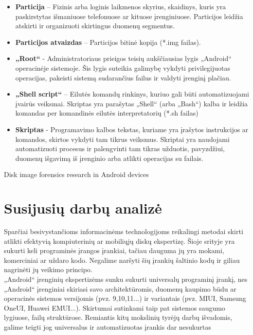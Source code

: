 \documentclass[a4paper,12pt,fleqn]{article}
\begin{document}
\begin{itemize}
     \item \textbf{Particija} – Fizinis arba loginis laikmenos skyrius, skaidinys, kuris yra paskirstytas išmaniuose telefonuose ar kituose įrenginiuose. Particijos leidžia atskirti ir organizuoti skirtingus duomenų segmentus.
     \item \textbf{Particijos atvaizdas} – Particijos bitinė kopija (*.img failas).
     \item \textbf{„Root“}  - Administratoriaus prieigos teisių aukščiausias lygis „Android“ operacinėje sistemoje. Šis lygis suteikia galimybę vykdyti privilegijuotas operacijas, pakeisti sistemą sudarančius failus ir valdyti įrenginį plačiau.
     \item \textbf{„Shell script“} – Eilutės komandų rinkinys, kuriuo gali būti automatizuojami įvairūs veiksmai. Skriptas yra parašytas „Shell“ (arba „Bash“) kalba ir leidžia komandas per komandinės eilutės interpretatorių (*.sh failas)
     \item \textbf{Skriptas} - Programavimo kalbos tekstas, kuriame yra įrašytos instrukcijos ar komandos, skirtos vykdyti tam tikrus veiksmus. Skriptai yra naudojami automatizuoti procesus ir palengvinti tam tikras užduotis, pavyzdžiui, duomenų išgavimą iš įrenginio arba atlikti operacijas su failais.
     

 \end{itemize}

\bothabstracts{}%
{Disk image forensics research in Android devices} %
{}%



 \newpage
\section{Susijusių darbų analizė}
Sparčiai besivystančioms informacinėms technologijoms reikalingi metodai skirti atlikti  efektyvią kompiuterinių ar mobiliųjų diskų ekspertizę. Šioje srityje yra sukurti keli programinės įrangos įrankiai, tačiau dauguma jų yra mokami, komerciniai ar uždaro kodo. Negalime naršyti šių įrankių šaltinio kodų ir giliau nagrinėti jų veikimo principo. \\


„Android“ įrenginių ekspertizėms sunku sukurti universalų programinį įrankį, nes „Android“ įrenginiai skiriasi savo architektūromis, duomenų kaupimo būdu ar operacinės sistemos versijomis (pvz. 9,10,11...) ir variantais (pvz. MIUI, Samsung OneUI, Huawei EMUI...). Skirtumai sutinkami taip pat sistemos saugumo lygiuose, failų struktūrose.  Remiantis kitų mokslinių tyrėjų darbų išvadomis, galime teigti jog universalus ir automatizuotas įrankis dar nesukurtas \cite{practicalforensics} \cite{AutomatedForensics}\\
\end{document}
